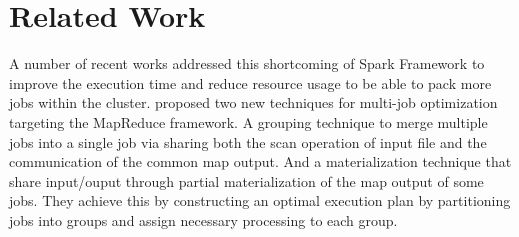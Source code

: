 \documentclass[conference]{sig-alternate-05-2015}
\begin{document}
\section{Related Work}
A number of recent works addressed this shortcoming of Spark Framework to improve the execution time and reduce resource usage to be able to pack more jobs within the cluster. \cite{Wang:2013du} proposed two new techniques for multi-job optimization targeting the MapReduce framework. A grouping technique to merge multiple jobs into a single job via sharing both the scan operation of input file and the communication of the common map output. And a materialization technique that share input/ouput through partial materialization of the map output of some jobs. They achieve this by constructing an optimal execution plan by partitioning jobs into groups and assign necessary processing to each group. 




\end{document}
